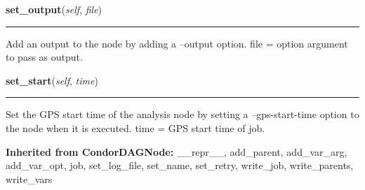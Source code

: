     \label{pipeline:AnalysisNode:set_output}
    \vspace{0.5ex}

    \noindent\begin{boxedminipage}{\textwidth}

    \raggedright \textbf{set\_output}(\textit{self}, \textit{file})

    \vspace{-1.5ex}

    \rule{\textwidth}{0.5\fboxrule}
    Add an output to the node by adding a --output option. file = option 
    argument to pass as output.

    \vspace{1ex}

    \end{boxedminipage}

    \label{pipeline:AnalysisNode:set_start}
    \vspace{0.5ex}

    \noindent\begin{boxedminipage}{\textwidth}

    \raggedright \textbf{set\_start}(\textit{self}, \textit{time})

    \vspace{-1.5ex}

    \rule{\textwidth}{0.5\fboxrule}
    Set the GPS start time of the analysis node by setting a 
    --gps-start-time option to the node when it is executed. time = GPS 
    start time of job.

    \vspace{1ex}

    \end{boxedminipage}

  \noindent\textbf{Inherited from CondorDAGNode:}
    \_\_repr\_\_,
    add\_parent,
    add\_var\_arg,
    add\_var\_opt,
    job,
    set\_log\_file,
    set\_name,
    set\_retry,
    write\_job,
    write\_parents,
    write\_vars


